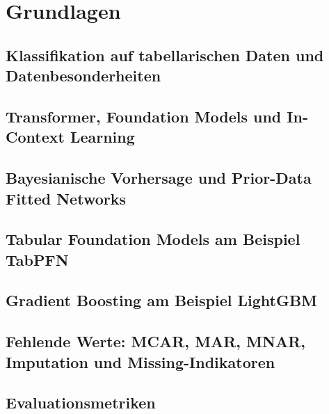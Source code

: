 \section{Grundlagen}\label{sec:grundlagen}

\subsection{Klassifikation auf tabellarischen Daten und Datenbesonderheiten}\label{sec:grundlagen-tabellen}

\subsection{Transformer, Foundation Models und In-Context Learning}\label{sec:grundlagen-icl}

\subsection{Bayesianische Vorhersage und Prior-Data Fitted Networks}\label{sec:grundlagen-pfn}

\subsection{Tabular Foundation Models am Beispiel TabPFN}\label{sec:grundlagen-tabpfn}

\subsection{Gradient Boosting am Beispiel LightGBM}\label{sec:grundlagen-lightgbm}

\subsection{Fehlende Werte: MCAR, MAR, MNAR, Imputation und Missing-Indikatoren}\label{sec:grundlagen-missing}

\subsection{Evaluationsmetriken}\label{sec:grundlagen-metriken}
